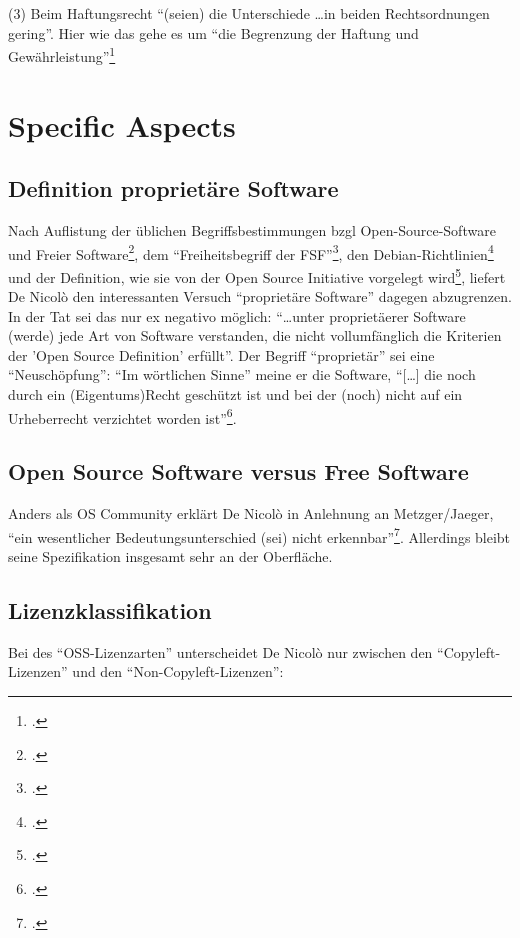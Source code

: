 \documentclass[DIV=calc,BCOR=5mm,11pt,headings=small,oneside,abstract=true, toc=bib]{scrartcl}
\begin{document}
(3) Beim Haftungsrecht \enquote{(seien) die Unterschiede \ldots in beiden
Rechtsordnungen gering}. Hier wie das gehe es um \enquote{die Begrenzung der
Haftung und Gewährleistung}\footcite[vgl.][160]{DeNicolo2010a}
 
\section{Specific Aspects}

\subsection{Definition proprietäre Software}
Nach Auflistung der üblichen Begriffsbestimmungen bzgl Open-Source-Software und
Freier Software\footcite[vgl.][11]{DeNicolo2010a}, dem \enquote{Freiheitsbegriff
der FSF}\footcite[vgl.][11f]{DeNicolo2010a}, den
Debian-Richtlinien\footcite[vgl.][12]{DeNicolo2010a} und der Definition, wie sie
von der Open Source Initiative vorgelegt
wird\footcite[vgl.][13f]{DeNicolo2010a}, liefert De Nicolò den interessanten
Versuch \enquote{proprietäre Software} dagegen abzugrenzen. In der Tat sei
das nur ex negativo möglich: \enquote{\ldots unter proprietäerer Software (werde)
jede Art von Software verstanden, die nicht vollumfänglich die Kriterien der
'Open Source Definition' erfüllt}. Der Begriff \enquote{proprietär} sei eine
\enquote{Neuschöpfung}: \enquote{Im wörtlichen Sinne} meine er die
Software, \enquote{[\ldots] die noch durch ein (Eigentums)Recht geschützt
ist und bei der (noch) nicht auf ein Urheberrecht verzichtet worden
ist}\footcite[vgl.][14f]{DeNicolo2010a}.

\subsection{Open Source Software versus Free Software}

Anders als OS Community erklärt De Nicolò in Anlehnung an Metzger/Jaeger,
\enquote{ein wesentlicher Bedeutungsunterschied (sei) nicht
erkennbar}\footcite[vgl.][11]{DeNicolo2010a}. Allerdings bleibt seine
Spezifikation insgesamt sehr an der Oberfläche.

\subsection{Lizenzklassifikation}

Bei des \enquote{OSS-Lizenzarten} unterscheidet De Nicolò nur zwischen den
\enquote{Copyleft-Lizenzen} und den \enquote{Non-Copyleft-Lizenzen}: 
\end{document}
